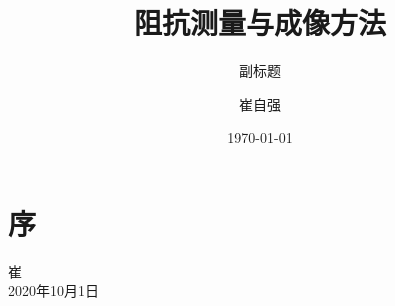\documentclass[cn,12pt,color=heda,chinesefont=macos,margintrue,toc=twocol,twoside,display,chinese]{etbook}
\title{阻抗测量与成像方法}
\subtitle{副标题}
\author{崔自强}
\institute{天津大学自动化学院}
\date{\today}
\begin{document}
\maketitle
\frontmatter

\chapter*{序}




\vskip 1.5cm

\begin{flushright}
崔\\
2020年10月1日
\end{flushright}

\tableofcontents

\mainmatter




\cite{Dashliborun2019a}




\end{document}
